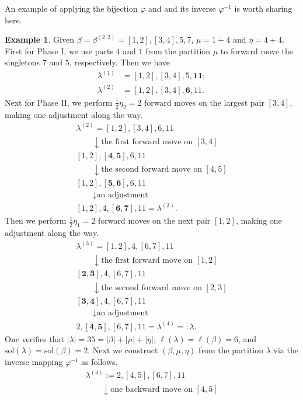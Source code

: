 \documentclass[11pt,reqno]{amsart}
\numberwithin{equation}{section}
\theoremstyle{plain}
\theoremstyle{definition}
\newtheorem{example}[theorem]{Example}
\def\sol{\mathrm{sol}}
\def\la{\lambda}
\begin{document}
An example of applying the bijection $\varphi$ and and its inverse $\varphi^{-1}$ is worth sharing here.
\begin{example}
Given $\beta=\beta^{(2,2)}=[1, 2], [3, 4], 5, 7$, $\mu=1+4$ and $\eta=4+4$. First for Phase I, we use parts $4$ and $1$ from the partition $\mu$ to forward move the singletons $7$ and $5$, respectively. Then we have 
\begin{align*}
\la^{(1)} &=[1, 2], [3, 4], 5, \mathbf{11};\\
\la^{(2)} &=[1, 2], [3, 4], \mathbf{6}, 11.
\end{align*}
Next for Phase II, we perform $\frac{1}{2}\eta_{2}=2$ forward moves on the largest pair $[3, 4]$, making one adjustment along the way.
$$
\begin{gathered}
\la^{(2)}=[1, 2], [3, 4], 6, 11\\
\qquad \downarrow \text {the first forward move on $[3, 4]$} \\
[1, 2], \mathbf{[4, 5]}, 6, 11\\
\qquad \downarrow \text {the second forward move on $[4, 5]$} \\
[1, 2], \mathbf{[5, 6]}, 6, 11\\
\qquad \downarrow \text {an adjustment} \\
[1, 2], 4, \mathbf{[6, 7]}, 11=\la^{(3)}.
\end{gathered}
$$
Then we perform $\frac{1}{2}\eta_{1}=2$ forward moves on the next pair $[1, 2]$, making one adjustment along the way.
$$
\begin{gathered}
\la^{(3)}=[1,2], 4, [6, 7], 11\\
\qquad \downarrow \text {the first forward move on $[1, 2]$}\\
\mathbf{[2, 3]}, 4, [6, 7], 11\\
\qquad \downarrow \text {the second forward move on $[2, 3]$}\\
\mathbf{[3, 4]}, 4, [6, 7], 11\\
\qquad \downarrow \text {an adjustment}\\
2, \mathbf{[4, 5]}, [6, 7], 11=\la^{(4)}=:\la.
\end{gathered}
$$
One verifies that $|\lambda|=35=|\beta|+|\mu|+|\eta|$, $\ell(\la)=\ell(\beta)=6$, and $\sol(\la)=\sol(\beta)=2$. Next we construct $(\beta, \mu, \eta)$ from the partition $\lambda$ via the inverse mapping $\varphi^{-1}$ as follows.
$$
\begin{gathered}
\la^{(4)}:=2, [4, 5], [6, 7], 11\\
\qquad \downarrow \text {one backward move on $[4, 5]$}\\

\end{gathered}$$
\end{example}
\end{document}
